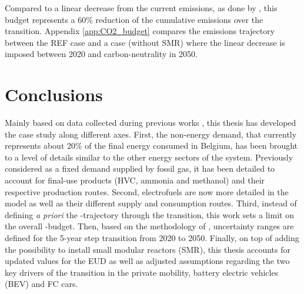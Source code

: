 Compared to a linear decrease from the current emissions, as done by \citet{limpens2024pathway}, this budget represents a 60\% reduction of the cumulative emissions over the transition.  Appendix \ref{app:CO2_budget} compares the emissions trajectory between the REF case and a case (without \gls{SMR}) where the linear decrease is imposed between 2020 and carbon-neutrality in 2050.

\section{Conclusions}
\label{sec:cs:conclusions}
Mainly based on data collected during previous works \cite{Moret2017PhDThesis,limpens2021generating}, this thesis has developed the case study along different axes. First, the non-energy demand, that currently represents about 20\% of the final energy consumed in Belgium, has been brought to a level of details similar to the other energy sectors of the system. Previously considered as a fixed demand supplied by fossil gas, it has been detailed to account for final-use products (\ie \acrfull{HVC}, ammonia and methanol) and their respective production routes. Second, electrofuels are now more detailed in the model as well as their different supply and consumption routes. Third, instead of defining \textit{a priori} the -trajectory through the transition, this work sets a limit on the overall -budget. Then, based on the methodology of \citet{Moret2017}, uncertainty ranges are defined for the 5-year step transition from 2020 to 2050. Finally, on top of adding the possibility to install small modular reactors (SMR), this thesis accounts for updated values for the \gls{EUD} as well as adjusted assumptions regarding the two key drivers of the transition in the private mobility, \ie battery electric vehicles (BEV) and \acrfull{FC} cars.